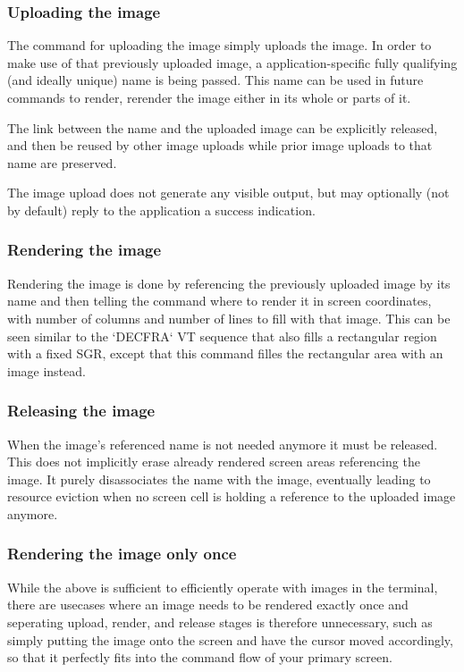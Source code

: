\documentclass[a4paper]{article}
\begin{document}
\subsubsection*{Uploading the image} %

The command for uploading the image simply uploads the image.
In order to make use of that previously uploaded image, a application-specific
fully qualifying (and ideally unique) name is being passed.
This name can be used in future commands to render, rerender the image
either in its whole or parts of it.

The link between the name and the uploaded image can be explicitly released,
and then be reused by other image uploads while prior image uploads to that
name are preserved.

The image upload does not generate any visible output, but may optionally
(not by default) reply to the application a success indication.

\subsubsection*{Rendering the image} %

Rendering the image is done by referencing the previously uploaded
image by its name and then telling the command where to render it
in screen coordinates, with number of columns and number of lines to fill
with that image. This can be seen similar to the `DECFRA` VT sequence
that also fills a rectangular region with a fixed SGR, except
that this command filles the rectangular area with an image instead.

\subsubsection*{Releasing the image} %

When the image's referenced name is not needed anymore it must be released.
This does not implicitly erase already rendered screen areas referencing the image.
It purely disassociates the name with the image, eventually leading
to resource eviction when no screen cell is holding a reference to the
uploaded image anymore.

\subsubsection*{Rendering the image only once} %

While the above is sufficient to efficiently operate with images in the terminal,
there are usecases where an image needs to be rendered exactly once and
seperating upload, render, and release stages is therefore unnecessary,
such as simply putting the image onto the screen and have the cursor moved
accordingly, so that it perfectly fits into the command flow of your primary screen.
\end{document}
